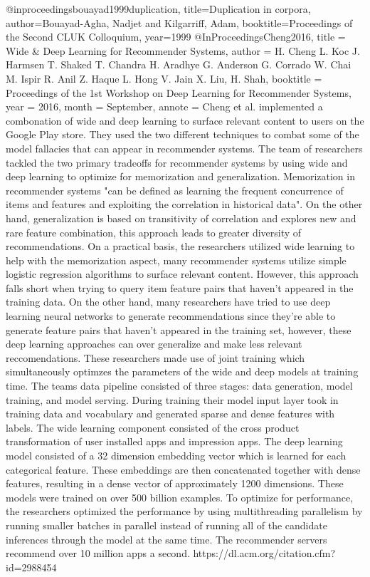 @inproceedings{bouayad1999duplication,
  title={Duplication in corpora},
  author={Bouayad-Agha, Nadjet and Kilgarriff, Adam},
  booktitle={Proceedings of the Second CLUK Colloquium},
  year={1999}
}
@InProceedings{Cheng2016,
  title = {Wide \& Deep Learning for Recommender Systems},
  author = {H. Cheng L. Koc J. Harmsen T. Shaked T. Chandra H. Aradhye G. Anderson G. Corrado W. Chai M. Ispir R. Anil Z. Haque L. Hong V. Jain X. Liu, H. Shah},
  booktitle = {Proceedings of the 1st Workshop on Deep Learning for Recommender Systems},
  year = {2016},
  month = {September},
  annote = {Cheng et al. implemented a combonation of wide and deep learning to surface relevant content to 
  users on the Google Play store. They used the two different techniques to combat some of the model fallacies that
  can appear in recommender systems. The team of researchers tackled the two primary tradeoffs for recommender systems 
  by using wide and deep learning to optimize for memorization and generalization. Memorization in recommender
  systems "can be defined as learning the frequent concurrence of items and features and exploiting the correlation in historical
  data". On the other hand, generalization is based on transitivity of correlation and explores new and rare feature combination, this
  approach leads to greater diversity of recommendations. On a practical basis, the researchers utilized wide learning to help with the memorization
  aspect, many recommender systems utilize simple logistic regression algorithms to surface relevant content. However, this approach falls short when
  trying to query item feature pairs that haven't appeared in the training data. On the other hand, many researchers have tried to use
  deep learning neural networks to generate recommendations since they're able to generate feature pairs that haven't appeared in the training set,
  however, these deep learning approaches can over generalize and make less relevant reccomendations. These researchers made use of joint training
  which simultaneously optimzes the parameters of the wide and deep models at training time. The teams data pipeline consisted of three stages: data generation, 
  model training, and model serving. During training their model input layer took in training data and vocabulary and generated sparse and dense features with labels.
  The wide learning component consisted of the cross product transformation of user installed apps and impression apps. The deep learning model consisted of a 32 dimension
  embedding vector which is learned for each categorical feature. These embeddings are then concatenated together with dense features, resulting in a dense vector of
  approximately 1200 dimensions. These models were trained on over 500 billion examples. To optimize for performance, the researchers optimized the performance by using multithreading
  parallelism by running smaller batches in parallel instead of running all of the candidate inferences through the model at the same time. The recommender servers recommend over 10 million
  apps a second.
  https://dl.acm.org/citation.cfm?id=2988454
  }
}

